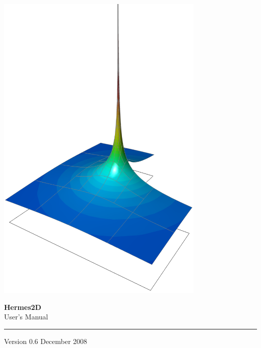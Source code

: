 

\pagestyle{empty}


\vspace*{0.8cm}

\begin{center}
\hspace{-8mm}\includegraphics[width=0.75\textwidth]{img/title.png}
\end{center}

\vspace{-0.3cm}

{\Huge\bf Hermes2D}\\[6mm]
{\LARGE User's Manual}\\[2mm]
\hrule

\vspace{3mm}
{\Large Version 0.6 \hfill December 2008}



\newpage
\pagestyle{plain}
